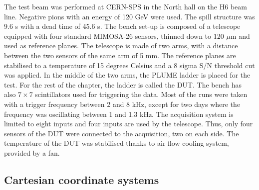     The test beam was performed at CERN-SPS in the North hall on the H6 beam line.
    Negative pions with an energy of 120 GeV were used.
    The spill structure was 9.6 s with a dead time of 45.6 s. 
    The bench set-up is composed of a telescope equipped with four standard MIMOSA-26 sensors, thinned down to 120 $\mu\text{m}$ and used as reference planes.
    The telescope is made of two arms, with a distance between the two sensors of the same arm of 5 mm.
    The reference planes are stabilised to a temperature of 15 degrees Celsius and a 8 sigma S/N threshold cut was applied.
    In the middle of the two arms, the PLUME ladder is placed  for the test.
    For the rest of the chapter, the ladder is called the \gls{DUT}.
    The bench has also $7 \times 7$ scintillators used for triggering the data.
    Most of the runs were taken with a trigger frequency between 2 and 8 kHz, except for two days where the frequency was oscillating between 1 and 1.3 kHz.
    The acquisition system is limited to eight inputs and four inputs are used by the telescope.
    Thus, only four sensors of the \gls{DUT} were connected to the acquisition, two on each side.
    The temperature of the \gls{DUT} was stabilised thanks to air flow cooling system, provided by a fan.


    \subsection{Cartesian coordinate systems}

